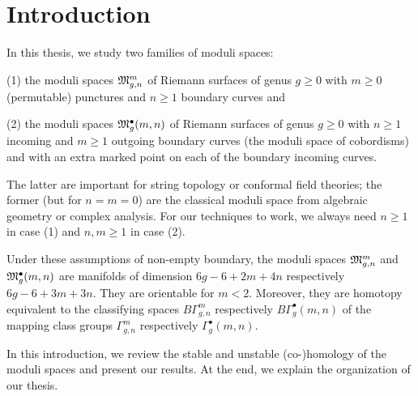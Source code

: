 \chapter{Introduction}
In this thesis, we study two families of moduli spaces:

\noindent
(1) the moduli spaces $\Modspc[n]$ of Riemann surfaces of genus $g \ge 0$ with $m \ge 0$ (permutable) punctures and $n \ge 1$ boundary curves and

\noindent
(2) the moduli spaces $\ModspcRad$ of Riemann surfaces of genus $g \ge 0$ with $n \ge 1$ incoming and $m \ge 1$ outgoing boundary curves (the moduli space of cobordisms) and
with an extra marked point on each of the boundary incoming curves.

The latter are important for string topology or conformal field theories; the former (but for $n=m=0$) are the classical moduli space from algebraic geometry or complex analysis.
For our techniques to work, we always need $n \ge 1$ in case (1) and $n,m \ge 1$ in case (2).

Under these assumptions of non-empty boundary, the moduli spaces $\Modspc$ and $\ModspcRad$ are manifolds of dimension $6g-6+2m+4n$ respectively $6g-6+3m+3n$.
They are orientable for $m < 2$.
Moreover, they are homotopy equivalent to the classifying spaces $B\Gamma_{g,n}^m$ respectively $B\Gamma^\bullet_g(m,n)$ of the mapping class groups $\Gamma_{g,n}^m$ respectively $\Gamma^\bullet_g(m,n)$.

In this introduction, we review the stable and unstable (co-)homology of the moduli spaces and present our results.
At the end, we explain the organization of our thesis.






